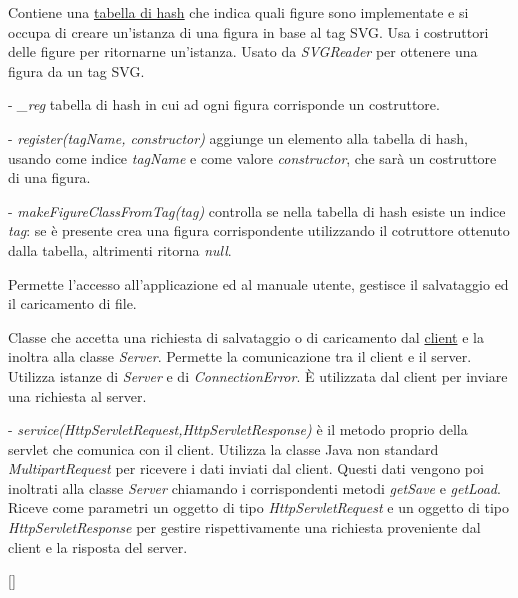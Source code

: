 Contiene una \underline{tabella di hash} che indica quali figure sono implementate e si occupa di creare un'istanza di una figura in base al tag SVG.
Usa i costruttori delle figure per ritornarne un'istanza.
Usato da \textit{SVGReader} per ottenere una figura da un tag SVG.
\begin{elencopuntato}[\subsubsecindent]
\item[-] \textit{{\_}reg} tabella di hash in cui ad ogni figura corrisponde un costruttore.
\end{elencopuntato}
\begin{elencopuntato}[\subsubsecindent]
\item[-] \textit{register(tagName, constructor)} aggiunge un elemento alla tabella di hash, usando come indice \textit{tagName} e come valore \textit{constructor}, che sar\`a un costruttore di una figura.
\item[-] \textit{makeFigureClassFromTag(tag)} controlla se nella tabella di hash esiste un indice \textit{tag}: se \`e presente crea una figura corrispondente utilizzando il cotruttore ottenuto dalla tabella, altrimenti ritorna \textit{null}.
\end{elencopuntato}

Permette l'accesso all'applicazione ed al manuale utente, gestisce il salvataggio ed il caricamento di file.

Classe che accetta una richiesta di salvataggio o di caricamento dal \underline{client} e la inoltra alla classe \textit{Server}. Permette la comunicazione tra il client e il server.
Utilizza istanze di \textit{Server} e di \textit{ConnectionError}.
\`E utilizzata dal client per inviare una richiesta al server.
\begin{elencopuntato}[\subsubsecindent]
\item[-] \textit{service(HttpServletRequest,HttpServletResponse)} \`e il metodo proprio della servlet che comunica con il client. Utilizza la classe Java non standard \textit{MultipartRequest} per ricevere i dati inviati dal client. Questi dati vengono poi inoltrati alla classe \textit{Server} chiamando i corrispondenti metodi \textit{getSave} e \textit{getLoad}. Riceve come parametri un oggetto di tipo \textit{HttpServletRequest} e un oggetto di tipo \textit{HttpServletResponse} per gestire rispettivamente una richiesta proveniente dal client e la risposta del server.
\end{elencopuntato}[\subsubsecindent]

